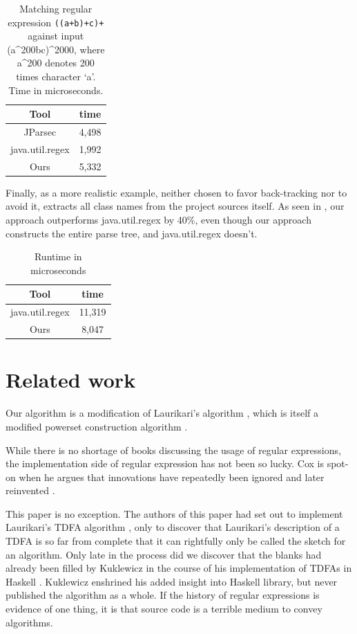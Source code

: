 \documentclass[english]{sigplanconf}
\theoremstyle{definition}
\begin{document}
\begin{table}
\begin{tabular}{cc}
\hline 
Tool & time\tabularnewline
\hline 
\hline 
JParsec & 4,498\tabularnewline
\hline 
java.util.regex & 1,992\tabularnewline
\hline 
Ours & 5,332\tabularnewline
\hline 
\end{tabular}
\caption{Matching regular expression \texttt{((a+b)+c)+} against input (a\^{}200bc)\^{}2000, where a\^{}200 denotes 200 times character `a'. Time in microseconds.}
\end{table}

Finally, as a more realistic example, neither chosen to favor
back-tracking nor to avoid it,  extracts all class names from the
project sources itself.  As seen in , our approach
outperforms java.util.regex by 40\%, even though our approach
constructs the entire parse tree, and java.util.regex doesn't.

\begin{table}
\begin{tabular}{cc}
\hline 
Tool & time\tabularnewline
\hline 
\hline 
java.util.regex & 11,319\tabularnewline
\hline 
Ours & 8,047\tabularnewline
\hline 
\end{tabular}
\caption{Runtime in microseconds}
\end{table}


\section{Related work}
Our algorithm is a modification of Laurikari's algorithm \cite{Laur00a},
which is itself a modified powerset construction algorithm \cite[p. 55]{Sips05a}.

While there is no shortage of books discussing the usage of regular
expressions, the implementation side of regular expression has not
been so lucky. Cox is spot-on when he argues that innovations have
repeatedly been ignored and later reinvented \cite{Cox07a,Cox09a,Cox10a}. 

This paper is no exception. The authors of this paper had set out
to implement Laurikari's TDFA algorithm \cite{Laur00a},
only to discover that Laurikari's description of a TDFA is so far
from complete that it can rightfully only be called the sketch for
an algorithm. Only late in the process did we discover that the blanks
had already been filled by Kuklewicz in the course of his implementation
of TDFAs in Haskell \cite{Kukl07a}. Kuklewicz enshrined his
added insight into Haskell library, but never published the algorithm
as a whole. If the history of regular expressions is evidence of one
thing, it is that source code is a terrible medium to convey algorithms. 
\end{document}
